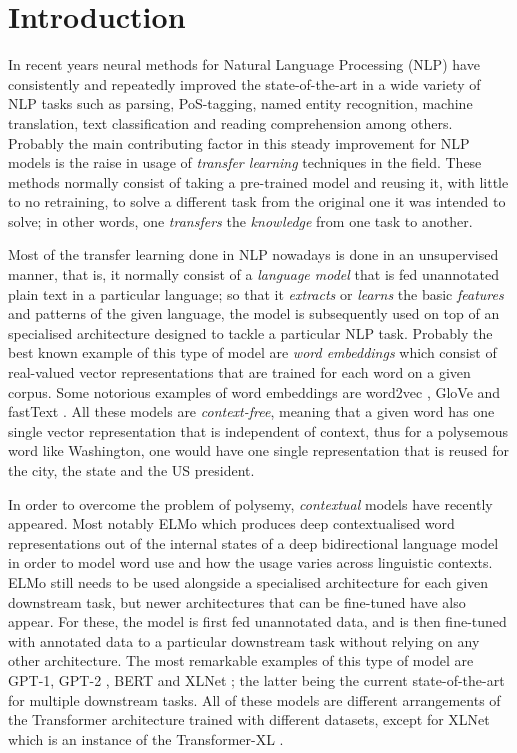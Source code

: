 \section{Introduction}

In recent years neural methods for Natural Language Processing (NLP) have consistently and repeatedly improved the state-of-the-art in a wide variety of NLP tasks such as parsing, PoS-tagging, named entity recognition, machine translation, text classification and reading comprehension among others. Probably the main contributing factor in this steady improvement for NLP models is the raise in usage of \emph{transfer learning} techniques in the field. These methods normally consist of taking a pre-trained model and reusing it, with little to no retraining, to solve a different task from the original one it was intended to solve; in other words, one \emph{transfers} the \emph{knowledge} from one task to another.

Most of the transfer learning done in NLP nowadays is done in an unsupervised manner, that is, it normally consist of a  \emph{language model} that is fed unannotated plain text in a particular language; so that it \emph{extracts} or \emph{learns} the basic \emph{features} and patterns of the given language, the model is subsequently used on top of an specialised architecture designed to tackle a particular NLP task. Probably the best known example of this type of model are \emph{word embeddings} which consist of real-valued vector representations that are trained for each word on a given corpus. Some notorious examples of word embeddings are word2vec \citep{mikolov-etal-2013-distributed}, GloVe \citep{pennington-etal-2014-glove} and \mbox{fastText} \citep{mikolov-etal-2018-advances}. All these models are \emph{context-free}, meaning that a given word has one single vector representation that is independent of context, thus for a polysemous word like Washington, one would have one single representation that is reused for the city, the state and the US president.

In order to overcome the problem of polysemy, \emph{contextual} models have recently appeared. Most notably ELMo \citep{peters-etal-2018-deep} which produces deep contextualised word representations out of the internal states of a deep bidirectional language model in order to model word use and how the usage varies across linguistic contexts. ELMo still needs to be used alongside a specialised architecture for each given downstream task, but newer architectures that can be fine-tuned have also appear. For these, the model is first fed unannotated data, and is then fine-tuned with annotated data to a particular downstream task without relying on any other architecture. The most remarkable examples of this type of model are GPT-1, GPT-2 \citep{radford-etal-2018-improving,radford-etal-2019-language}, BERT \citep{devlin-etal-2019-bert} and XLNet \citep{yang-etal-2019-xlnet}; the latter being the current state-of-the-art for multiple downstream tasks. All of these models are different arrangements of the Transformer architecture \citep{vaswani-etal-2017-attention} trained with different datasets, except for XLNet which is an instance of the Transformer-XL \citep{dai-etal-2019-transformer}.

